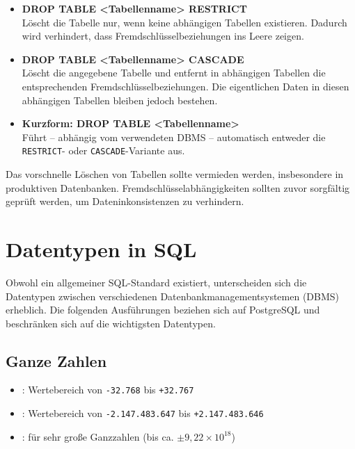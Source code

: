 \begin{itemize}
    \item \textbf{DROP TABLE <Tabellenname> RESTRICT}\\
    Löscht die Tabelle nur, wenn keine abhängigen Tabellen existieren. 
    Dadurch wird verhindert, dass Fremdschlüsselbeziehungen ins Leere zeigen.
    
    \item \textbf{DROP TABLE <Tabellenname> CASCADE}\\
    Löscht die angegebene Tabelle und entfernt in abhängigen Tabellen die entsprechenden Fremdschlüsselbeziehungen. 
    Die eigentlichen Daten in diesen abhängigen Tabellen bleiben jedoch bestehen.
    
    \item \textbf{Kurzform: DROP TABLE <Tabellenname>}\\
    Führt – abhängig vom verwendeten DBMS – automatisch entweder die \texttt{RESTRICT}- oder \texttt{CASCADE}-Variante aus.
\end{itemize}

\begin{tcolorbox}[red, title={Hinweis}]
    Das vorschnelle Löschen von Tabellen sollte vermieden werden, insbesondere in produktiven Datenbanken. 
    Fremdschlüsselabhängigkeiten sollten zuvor sorgfältig geprüft werden, um Dateninkonsistenzen zu verhindern.
\end{tcolorbox}


\section{Datentypen in SQL}

Obwohl ein allgemeiner SQL-Standard existiert, unterscheiden sich die Datentypen zwischen verschiedenen Datenbankmanagementsystemen (DBMS) erheblich. 
Die folgenden Ausführungen beziehen sich auf PostgreSQL und beschränken sich auf die wichtigsten Datentypen.

\subsection{Ganze Zahlen}
\begin{itemize}
    \item \textbf{}: Wertebereich von \texttt{-32.768} bis \texttt{+32.767}
    \item \textbf{}: Wertebereich von \texttt{-2.147.483.647} bis \texttt{+2.147.483.646}
    \item \textbf{}: für sehr große Ganzzahlen (bis ca. $\pm 9{,}22 \times 10^{18}$)
\end{itemize}

